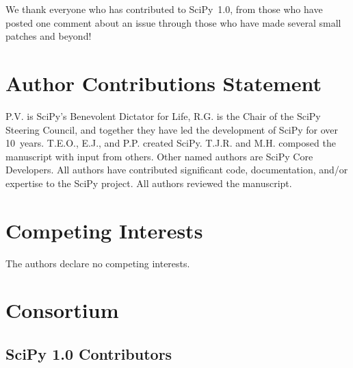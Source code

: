 \documentclass[fleqn,10pt]{wlscirep}
\begin{document}
We thank everyone who has contributed to SciPy~1.0, from those who have posted one comment about an issue through those who have made several small patches and beyond!

\section*{Author Contributions Statement}

P.V. is SciPy's Benevolent Dictator for Life, R.G. is the Chair of the SciPy Steering Council, and together they have led the development of SciPy for over 10~years. T.E.O., E.J., and P.P. created SciPy. T.J.R. and M.H. composed the manuscript with input from others. Other named authors are SciPy Core Developers. All authors have contributed significant code, documentation, and/or expertise to the SciPy project. All authors reviewed the manuscript.



\section*{Competing Interests}

The authors declare no competing interests.










\section*{Consortium}
\subsection*{SciPy 1.0 Contributors}
\end{document}
